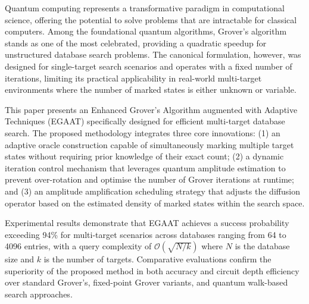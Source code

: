 Quantum computing represents a transformative paradigm in computational science,
offering the potential to solve problems that are intractable for classical computers.
Among the foundational quantum algorithms, Grover's algorithm stands as one of the
most celebrated, providing a quadratic speedup for unstructured database search
problems. The canonical formulation, however, was designed for single-target search
scenarios and operates with a fixed number of iterations, limiting its practical
applicability in real-world multi-target environments where the number of marked
states is either unknown or variable.

This paper presents an Enhanced Grover's Algorithm augmented with Adaptive Techniques
(EGAAT) specifically designed for efficient multi-target database search. The proposed
methodology integrates three core innovations: (1) an adaptive oracle construction
capable of simultaneously marking multiple target states without requiring prior
knowledge of their exact count; (2) a dynamic iteration control mechanism that
leverages quantum amplitude estimation to prevent over-rotation and optimise the
number of Grover iterations at runtime; and (3) an amplitude amplification scheduling
strategy that adjusts the diffusion operator based on the estimated density of marked
states within the search space.

Experimental results demonstrate that EGAAT achieves a success probability exceeding
94\% for multi-target scenarios across databases ranging from 64 to 4096 entries,
with a query complexity of $\mathcal{O}(\sqrt{N/k})$ where $N$ is the database size
and $k$ is the number of targets. Comparative evaluations confirm the superiority of
the proposed method in both accuracy and circuit depth efficiency over standard
Grover's, fixed-point Grover variants, and quantum walk-based search approaches.

